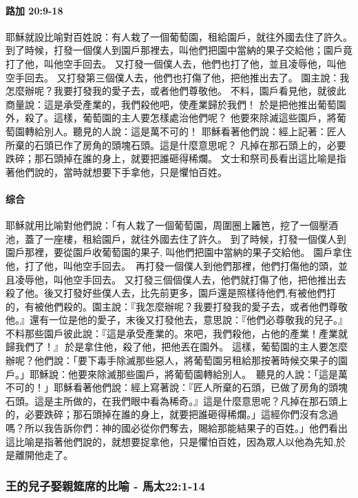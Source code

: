 \paragraph{路加 20:9-18}
耶穌就設比喻對百姓說：有人栽了一個葡萄園，租給園戶，就往外國去住了許久。
到了時候，打發一個僕人到園戶那裡去，叫他們把園中當納的果子交給他；園戶竟打了他，叫他空手回去。
又打發一個僕人去，他們也打了他，並且凌辱他，叫他空手回去。
又打發第三個僕人去，他們也打傷了他，把他推出去了。
園主說：我怎麼辦呢？我要打發我的愛子去，或者他們尊敬他。
不料，園戶看見他，就彼此商量說：這是承受產業的，我們殺他吧，使產業歸於我們！
於是把他推出葡萄園外，殺了。這樣，葡萄園的主人要怎樣處治他們呢？
他要來除滅這些園戶，將葡萄園轉給別人。聽見的人說：這是萬不可的！
耶穌看著他們說：經上記著：匠人所棄的石頭已作了房角的頭塊石頭。這是什麼意思呢？
凡掉在那石頭上的，必要跌碎；那石頭掉在誰的身上，就要把誰砸得稀爛。
文士和祭司長看出這比喻是指著他們說的，當時就想要下手拿他，只是懼怕百姓。
\paragraph{综合}
耶穌就用比喻對他們說：「有人栽了一個葡萄園，周圍圈上籬笆，挖了一個壓酒池，蓋了一座樓，租給園戶，就往外國去住了許久。 到了時候，打發一個僕人到園戶那裡，要從園戶收葡萄園的果子, 叫他們把園中當納的果子交給他。 園戶拿住他，打了他，叫他空手回去。  再打發一個僕人到他們那裡，他們打傷他的頭，並且凌辱他，叫他空手回去。 又打發三個個僕人去，他們就打傷了他，把他推出去殺了他。後又打發好些僕人去，比先前更多，園戶還是照樣待他們,有被他們打的，有被他們殺的。園主說：『我怎麼辦呢？我要打發我的愛子去，或者他們尊敬他。』還有一位是他的愛子，末後又打發他去，意思說：『他們必尊敬我的兒子。』 不料那些園戶彼此說：『這是承受產業的。來吧，我們殺他，占他的產業！產業就歸我們了！』 於是拿住他，殺了他，把他丟在園外。 這樣，葡萄園的主人要怎麼辦呢？他們說：「要下毒手除滅那些惡人，將葡萄園另租給那按著時候交果子的園戶。」耶穌說：他要來除滅那些園戶，將葡萄園轉給別人。  聽見的人說：「這是萬不可的！」耶穌看著他們說：經上寫著說：『匠人所棄的石頭，已做了房角的頭塊石頭。這是主所做的，在我們眼中看為稀奇。』這是什麼意思呢？凡掉在那石頭上的，必要跌碎；那石頭掉在誰的身上，就要把誰砸得稀爛。」這經你們沒有念過嗎？所以我告訴你們：神的國必從你們奪去，賜給那能結果子的百姓。」他們看出這比喻是指著他們說的，就想要捉拿他，只是懼怕百姓，因為眾人以他為先知,於是離開他走了。
\subsubsection{王的兒子娶親筵席的比喻 - 馬太22:1-14}

